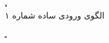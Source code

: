         \begin{figure}[!ht]
            \centering
            \begin{adjustbox}{minipage=\linewidth,scale=0.4}
                \begin{subfigure}[b]{0.4\textwidth}
                    \centering
                    \includegraphics[width=\textwidth]{images/pattern1.png}
                    \caption{الگوی ورودی ساده شماره ۱}
                    \label{fig:simple-pattern1}
                \end{subfigure}
                \hfill
                \begin{subfigure}[b]{0.4\textwidth}
                    \centering
                    \includegraphics[width=\textwidth]{images/pattern2.png}

\end{subfigure}
\end{adjustbox}
\end{figure}
